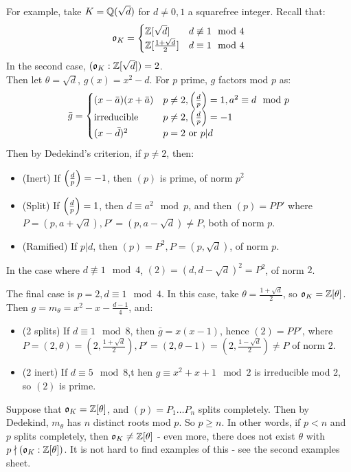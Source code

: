 \documentclass[10pt,a4paper]{article}
\begin{document}
For example, take $K = \mathbb{Q}(\sqrt{d})$ for $d \neq 0,1$ a squarefree integer. Recall that:
\begin{align*}
\mathfrak{o}_K = \begin{cases} \mathbb{Z}[\sqrt{d}] & d \not\equiv 1 \mod 4\\ \mathbb{Z}[\frac{1+\sqrt{d}}{2}] & d \equiv 1 \mod 4 \end{cases}
\end{align*}
In the second case, $(\mathfrak{o}_K:\mathbb{Z}[\sqrt{d}]) = 2$. \\
Then let $\theta = \sqrt{d}$, $g(x) = x^2-d$. For $p$ prime, $g$ factors mod $p$ as:
\begin{align*}
\bar{g} = \begin{cases} (x-\bar{a})(x+\bar{a}) & p \neq 2, \left(\frac{d}{p}\right)=1, a^2 \equiv d \mod p \\ \text{irreducible} & p \neq 2, \left(\frac{d}{p}\right) = -1 \\ (x-\bar{d})^2 & p = 2\text{ or } p|d \end{cases}
\end{align*}
Then by Dedekind's criterion, if $p \neq 2$, then:
\begin{itemize}
\item (Inert) If $\left(\frac{d}{p}\right) = -1$, then $(p)$ is prime, of norm $p^2$
\item (Split) If $\left(\frac{d}{p}\right) = 1$, then $d \equiv a^2 \mod p$, and then $(p) = PP'$ where $P = (p, a+\sqrt{d}), P' = (p, a-\sqrt{d}) \neq P$, both of norm $p$.
\item (Ramified) If $p|d$, then $(p) = P^2, P = (p, \sqrt{d})$, of norm $p$.
\end{itemize}

In the case where $d \nequiv 1 \mod 4$, $(2) = (d, d-\sqrt{d})^2 = P^2$, of norm $2$.

The final case is $p = 2, d \equiv 1 \mod 4$. In this case, take $\theta = \frac{1+\sqrt{d}}{2}$, so $\mathfrak{o}_K = \mathbb{Z}[\theta]$. Then $g = m_\theta = x^2-x-\frac{d-1}{4}$, and:
\begin{itemize}
\item (2 splits) If $d \equiv 1 \mod 8$, then $\bar{g} = x(x-1)$, hence $(2) = PP'$, where $P = (2, \theta) = (2, \frac{1+\sqrt{d}}{2}), P' = (2, \theta-1) = (2, \frac{1-\sqrt{d}}{2}) \neq P$ of norm $2$.
\item (2 inert) If $d \equiv 5 \mod 8$,t hen $g \equiv x^2+x+1 \mod 2$ is irreducible mod 2, so $(2)$ is prime.
\end{itemize}

Suppose that $\mathfrak{o}_K = \mathbb{Z}[\theta]$, and $(p) = P_1 \ldots P_n$ splits completely. Then by Dedekind, $m_\theta$ has $n$ distinct roots mod $p$. So $p \geq n$. In other words, if $p < n$ and $p$ splits completely, then $\mathfrak{o}_K \neq \mathbb{Z}[\theta]$ - even more, there does not exist $\theta$ with $p \nmid (\mathfrak{o}_K : \mathbb{Z}[\theta])$. It is not hard to find examples of this - see the second examples sheet.
\end{document}
